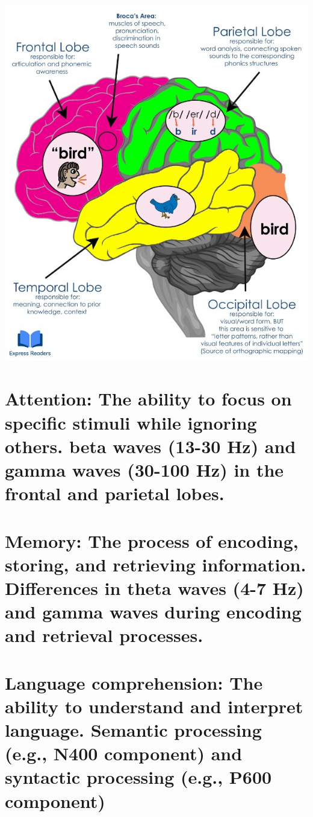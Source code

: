 \documentclass[11pt]{article}
\begin{document}
\begin{center}
\includegraphics[width=.9\linewidth]{../Figures/Brain_signals.jpg}
\end{center}

\section{Attention: The ability to focus on specific stimuli while ignoring others. beta waves (13-30 Hz) and gamma waves (30-100 Hz) in the frontal and parietal lobes.}
\label{sec:orgc587858}
\section{Memory: The process of encoding, storing, and retrieving information. Differences in theta waves (4-7 Hz) and gamma waves during encoding and retrieval processes.}
\label{sec:org858761a}
\section{Language comprehension: The ability to understand and interpret language. Semantic processing (e.g., N400 component) and syntactic processing (e.g., P600 component)}
\label{sec:org95c0e49}
\end{document}
